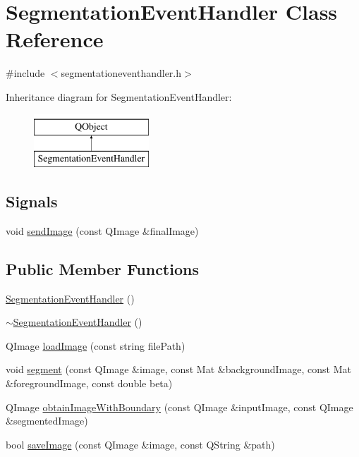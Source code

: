 \hypertarget{classSegmentationEventHandler}{\section{Segmentation\-Event\-Handler Class Reference}
\label{classSegmentationEventHandler}
}


{\ttfamily \#include $<$segmentationeventhandler.\-h$>$}

Inheritance diagram for Segmentation\-Event\-Handler\-:\begin{figure}[H]
\begin{center}
\leavevmode
\includegraphics[height=2.000000cm]{classSegmentationEventHandler}
\end{center}
\end{figure}
\subsection*{Signals}
\begin{DoxyCompactItemize}
\item 
void \hyperlink{classSegmentationEventHandler_a7e0469cfa7b7de154a7f4ab89aa5d01c}{send\-Image} (const Q\-Image \&final\-Image)
\end{DoxyCompactItemize}
\subsection*{Public Member Functions}
\begin{DoxyCompactItemize}
\item 
\hyperlink{classSegmentationEventHandler_ae9ae201d2babf6d7a75039b1df9914ac}{Segmentation\-Event\-Handler} ()
\item 
\hyperlink{classSegmentationEventHandler_a0ed321c52deb44c8db76b0d100e8b614}{$\sim$\-Segmentation\-Event\-Handler} ()
\item 
Q\-Image \hyperlink{classSegmentationEventHandler_a40df09d50701ea6490b5ba6bb1841919}{load\-Image} (const string file\-Path)
\item 
void \hyperlink{classSegmentationEventHandler_a8111dd952df6dca9f13ac0aa6bf4105b}{segment} (const Q\-Image \&image, const Mat \&background\-Image, const Mat \&foreground\-Image, const double beta)
\item 
Q\-Image \hyperlink{classSegmentationEventHandler_adfa64d0cda9254629fea83982c0a22e2}{obtain\-Image\-With\-Boundary} (const Q\-Image \&input\-Image, const Q\-Image \&segmented\-Image)
\item 
bool \hyperlink{classSegmentationEventHandler_a2e82ef87339a521615c721e5706f69b9}{save\-Image} (const Q\-Image \&image, const Q\-String \&path)
\end{DoxyCompactItemize}



